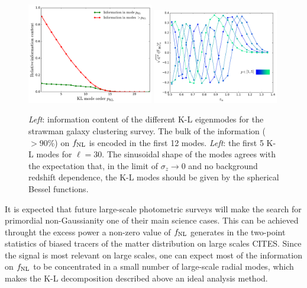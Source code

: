 \documentclass[twocolumn,amsfont,amssymb,amsmath, showpacs,balancelastpage, nofootinbib]{revtex4-1}
\begin{document}
    \begin{figure}
      \centering
      \includegraphics[width=0.49\textwidth]{Figs/information_gc}
      \includegraphics[width=0.49\textwidth]{Figs/kl_modes_gc}
      \caption{{\sl Left}: information content of the different K-L eigenmodes for the strawman galaxy clustering survey. The bulk of the information ($>90\%$) on $f_{\rm NL}$ is encoded in the first 12 modes. {\sl Left}: the first 5 K-L modes for $\ell=30$. The sinusoidal shape of the modes agrees with the expectation that, in the limit of $\sigma_z\rightarrow0$ and no background redshift dependence, the K-L modes should be given by the spherical Bessel functions. }\label{fig:kl_gc}
    \end{figure}
    It is expected that future large-scale photometric surveys will make the search for primordial non-Gaussianity one of their main science cases. This can be achieved throught the excess power a non-zero value of $f_{\rm NL}$ generates in the two-point statistics of biased tracers of the matter distribution on large scales CITES. Since the signal is most relevant on large scales, one can expect most of the information on $f_{\rm NL}$ to be concentrated in a small number of large-scale radial modes, which makes the K-L decomposition described above an ideal analysis method.
    
\end{document}
